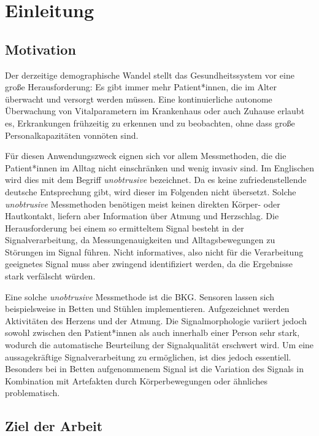 \chapter{Einleitung}\label{einleitung}

\section{Motivation}

Der derzeitige demographische Wandel stellt das Gesundheitssystem vor eine große Herausforderung: Es gibt immer mehr Patient*innen, die im Alter überwacht und versorgt werden müssen. Eine kontinuierliche autonome Überwachung von Vitalparametern im Krankenhaus oder auch Zuhause erlaubt es, Erkrankungen frühzeitig zu erkennen und zu beobachten, ohne dass große Personalkapazitäten vonnöten sind.

Für diesen Anwendungszweck eignen sich vor allem Messmethoden, die die Patient*innen im Alltag nicht einschränken und wenig invasiv sind. Im Englischen wird dies mit dem Begriff \textit{unobtrusive} bezeichnet. Da es keine zufriedenstellende deutsche Entsprechung gibt, wird dieser im Folgenden nicht übersetzt. Solche \textit{unobtrusive} Messmethoden benötigen meist keinen direkten Körper- oder Hautkontakt, liefern aber Information über Atmung und Herzschlag. Die Herausforderung bei einem so ermitteltem Signal besteht in der Signalverarbeitung, da Messungenauigkeiten und Alltagsbewegungen zu Störungen im Signal führen. Nicht informatives, also nicht für die Verarbeitung geeignetes Signal muss aber zwingend identifiziert werden, da die Ergebnisse stark verfälscht würden.

Eine solche \textit{unobtrusive} Messmethode ist die \acf{BKG}. Sensoren lassen sich beispielsweise in Betten und Stühlen implementieren. Aufgezeichnet werden Aktivitäten des Herzens und der Atmung. Die Signalmorphologie variiert jedoch sowohl zwischen den Patient*innen als auch innerhalb %
einer Person sehr stark, wodurch die automatische Beurteilung der Signalqualität erschwert wird. Um eine aussagekräftige Signalverarbeitung zu ermöglichen, ist dies jedoch essentiell. Besonders bei in Betten aufgenommenem Signal ist die Variation des Signals in Kombination mit Artefakten durch Körperbewegungen oder ähnliches problematisch.  
 

\section{Ziel der Arbeit}

